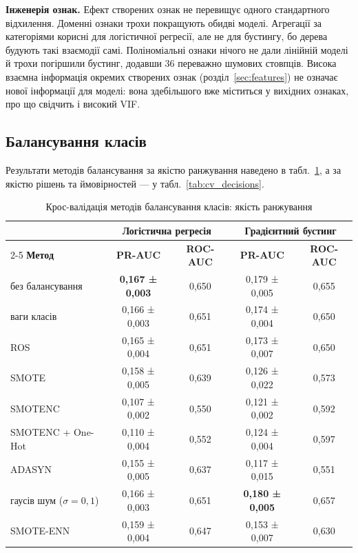 \documentclass[14pt,a4paper]{extreport}
\begin{document}
\textbf{Інженерія ознак.} Ефект створених ознак не перевищує одного стандартного відхилення. Доменні ознаки трохи покращують обидві моделі. Агрегації за категоріями корисні для логістичної регресії, але не для бустингу, бо дерева будують такі взаємодії самі. Поліноміальні ознаки нічого не дали лінійній моделі й трохи погіршили бустинг, додавши 36 переважно шумових стовпців. Висока взаємна інформація окремих створених ознак (розділ~\ref{sec:features}) не означає нової інформації для моделі: вона здебільшого вже міститься у вихідних ознаках, про що свідчить і високий VIF.

\subsection{Балансування класів}

Результати методів балансування за якістю ранжування наведено в табл.~\ref{tab:cv_resampling}, а за якістю рішень та ймовірностей --- у табл.~\ref{tab:cv_decisions}.

\begin{table}[H]
\caption{Крос-валідація методів балансування класів: якість ранжування}
\label{tab:cv_resampling}
\small
\renewcommand{\arraystretch}{1.15}
\begin{tabularx}{\linewidth}{|X|c|c|c|c|}
\hline
 & \multicolumn{2}{c|}{\textbf{Логістична регресія}} & \multicolumn{2}{c|}{\textbf{Градієнтний бустинг}} \\
\cline{2-5}
\textbf{Метод} & \textbf{PR-AUC} & \textbf{ROC-AUC} & \textbf{PR-AUC} & \textbf{ROC-AUC} \\
\hline
без балансування & \textbf{0,167 ± 0,003} & 0,650 & 0,179 ± 0,005 & 0,655 \\
\hline
ваги класів & 0,166 ± 0,003 & 0,651 & 0,174 ± 0,004 & 0,650 \\
\hline
ROS & 0,165 ± 0,004 & 0,651 & 0,173 ± 0,007 & 0,650 \\
\hline
SMOTE & 0,158 ± 0,005 & 0,639 & 0,126 ± 0,022 & 0,573 \\
\hline
SMOTENC & 0,107 ± 0,002 & 0,550 & 0,121 ± 0,002 & 0,592 \\
\hline
SMOTENC + One-Hot & 0,110 ± 0,004 & 0,552 & 0,124 ± 0,004 & 0,597 \\
\hline
ADASYN & 0,155 ± 0,005 & 0,637 & 0,117 ± 0,015 & 0,551 \\
\hline
гаусів шум ($\sigma = 0{,}1$) & 0,166 ± 0,003 & 0,651 & \textbf{0,180 ± 0,005} & 0,657 \\
\hline
SMOTE-ENN & 0,159 ± 0,004 & 0,647 & 0,153 ± 0,007 & 0,630 \\
\hline
\end{tabularx}
\end{table}
\end{document}
